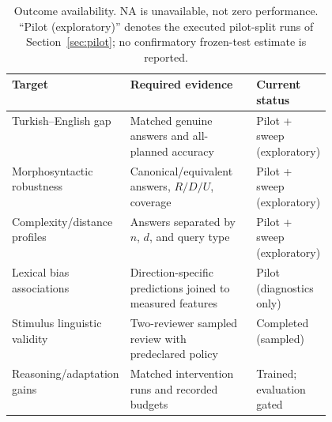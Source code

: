\begin{table}[t]
  \centering
  \caption{Outcome availability. NA is unavailable, not zero performance. ``Pilot (exploratory)'' denotes
  the executed pilot-split runs of Section~\ref{sec:pilot}; no confirmatory frozen-test estimate is
  reported.}
  \label{tab:availability}
  \small
  \begin{tabular}{@{}lp{0.47\linewidth}l@{}}
    \toprule
    Target & Required evidence & Current status \\
    \midrule
    Turkish--English gap        & Matched genuine answers and all-planned accuracy        & Pilot + sweep (exploratory) \\
    Morphosyntactic robustness  & Canonical/equivalent answers, $R/D/U$, coverage          & Pilot + sweep (exploratory) \\
    Complexity/distance profiles & Answers separated by $n$, $d$, and query type           & Pilot + sweep (exploratory) \\
    Lexical bias associations   & Direction-specific predictions joined to measured features & Pilot (diagnostics only) \\
    Stimulus linguistic validity & Two-reviewer sampled review with predeclared policy      & Completed (sampled) \\
    Reasoning/adaptation gains  & Matched intervention runs and recorded budgets           & Trained; evaluation gated \\
    \bottomrule
  \end{tabular}
\end{table}
